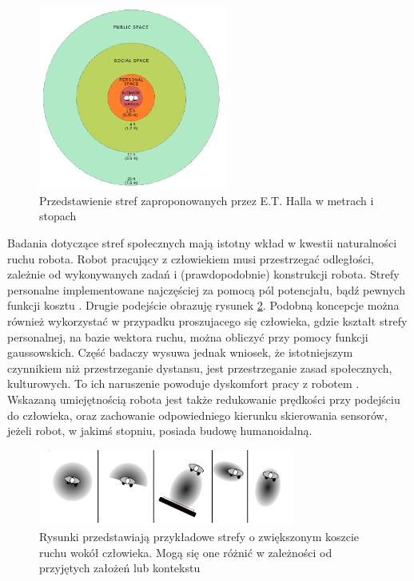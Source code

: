\begin{figure}[h]
	\centering
	\includegraphics[width=0.55\textwidth]{gfx/882px-Personal_Space.png}
	\caption{Przedstawienie stref zaproponowanych przez E.T. Halla w metrach i stopach\cite{dimension_zones}}
	\label{fig:hall_zones}
\end{figure}

Badania dotyczące stref społecznych mają istotny wkład w kwestii naturalności ruchu robota. Robot pracujący z człowiekiem musi przestrzegać odległości, zależnie od wykonywanych zadań i (prawdopodobnie) konstrukcji robota. Strefy personalne implementowane najczęściej za pomocą pól potencjału, bądź pewnych funkcji kosztu \cite{survey}. Drugie podejście obrazuję rysunek \ref{fig:cost_zones}. Podobną koncepcje można również wykorzystać w przypadku proszujacego się człowieka, gdzie kształt strefy personalnej, na bazie wektora ruchu, można obliczyć przy pomocy funkcji gaussowskich\cite{nrs}. Część badaczy wysuwa jednak wniosek, że istotniejszym czynnikiem niż przestrzeganie dystansu, jest przestrzeganie zasad społecznych, kulturowych. To ich naruszenie powoduje dyskomfort pracy z robotem \cite{survey}\cite{survey_2}. Wskazaną umiejętnością robota jest także redukowanie prędkości przy podejściu do człowieka, oraz zachowanie odpowiedniego kierunku skierowania sensorów, jeżeli robot, w jakimś stopniu, posiada budowę humanoidalną.

\begin{figure}[H]
	\centering
	\includegraphics[width=0.75\textwidth]{gfx/cost_zone.png}
	\caption{Rysunki przedstawiają przykładowe strefy o zwiększonym koszcie ruchu wokół człowieka. Mogą się one różnić w zależności od przyjętych założeń lub kontekstu\cite{survey}}
	\label{fig:cost_zones}
\end{figure}

